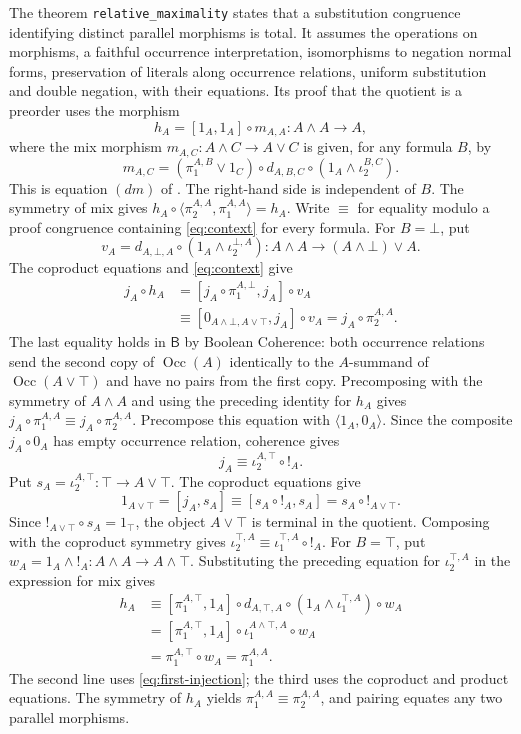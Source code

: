 \documentclass[11pt]{article}
\newcommand{\B}{\mathsf B}
\newcommand{\Occ}{\operatorname{Occ}}
\begin{document}
The theorem \texttt{relative\_maximality} states that a
substitution congruence identifying distinct parallel morphisms is total.
It assumes the operations on morphisms, a faithful occurrence interpretation,
isomorphisms to negation normal forms, preservation of literals
along occurrence relations, uniform substitution and double
negation, with their equations.
Its proof that the quotient is a preorder uses the morphism
\[
 h_A=[1_A,1_A]\circ m_{A,A}:A\wedge A\longrightarrow A,
\]
where the mix morphism $m_{A,C}:A\wedge C\to A\vee C$ is given, for any
formula $B$, by
\[
 m_{A,C}=(\pi_1^{A,B}\vee1_C)\circ d_{A,B,C}
              \circ(1_A\wedge\iota_2^{B,C}).
\]
This is equation $(dm)$ of \cite[\S11.1, p.~234]{DP}.
The right-hand side is independent of $B$. The symmetry of mix gives
$h_A\circ\langle\pi_2^{A,A},\pi_1^{A,A}\rangle=h_A$.
Write $\equiv$ for equality modulo a proof congruence containing \eqref{eq:context}
for every formula. For $B=\bot$, put
\[
 v_A=d_{A,\bot,A}\circ(1_A\wedge\iota_2^{\bot,A})
 :A\wedge A\longrightarrow(A\wedge\bot)\vee A.
\]
The coproduct equations and \eqref{eq:context} give
\[
 \begin{aligned}
 j_A\circ h_A
 &= [j_A\circ\pi_1^{A,\bot},j_A]\circ v_A\\
 &\equiv[0_{A\wedge\bot,A\vee\top},j_A]\circ v_A
  =j_A\circ\pi_2^{A,A}.
 \end{aligned}
\]
The last equality holds in $\B$ by Boolean Coherence: both occurrence
relations send the second copy of $\Occ(A)$ identically to the
$A$-summand of $\Occ(A\vee\top)$ and have no pairs from the first copy.
Precomposing with the symmetry of $A\wedge A$ and using the
preceding identity for $h_A$ gives
$j_A\circ\pi_1^{A,A}\equiv j_A\circ\pi_2^{A,A}$.
Precompose this equation with $\langle1_A,0_A\rangle$. Since the
composite $j_A\circ0_A$ has empty occurrence relation, coherence gives
\[
 j_A\equiv\iota_2^{A,\top}\circ!_A.
\]
Put $s_A=\iota_2^{A,\top}:\top\to A\vee\top$. The coproduct
equations give
\[
 1_{A\vee\top}=[j_A,s_A]
   \equiv[s_A\circ!_A,s_A]=s_A\circ!_{A\vee\top}.
\]
Since $!_{A\vee\top}\circ s_A=1_\top$, the object $A\vee\top$ is
terminal in the quotient. Composing with the coproduct symmetry gives
$\iota_2^{\top,A}\equiv\iota_1^{\top,A}\circ!_A$.
For $B=\top$, put
$w_A=1_A\wedge!_A:A\wedge A\to A\wedge\top$. Substituting the
preceding equation for $\iota_2^{\top,A}$ in the expression for mix gives
\[
 \begin{aligned}
 h_A&\equiv[\pi_1^{A,\top},1_A]\circ d_{A,\top,A}
             \circ(1_A\wedge\iota_1^{\top,A})\circ w_A\\
    &=[\pi_1^{A,\top},1_A]\circ\iota_1^{A\wedge\top,A}\circ w_A\\
    &=\pi_1^{A,\top}\circ w_A=\pi_1^{A,A}.
 \end{aligned}
\]
The second line uses \eqref{eq:first-injection}; the third uses the
coproduct and product equations. The symmetry of $h_A$ yields $\pi_1^{A,A}\equiv\pi_2^{A,A}$,
and pairing equates any two parallel morphisms.
\end{document}
